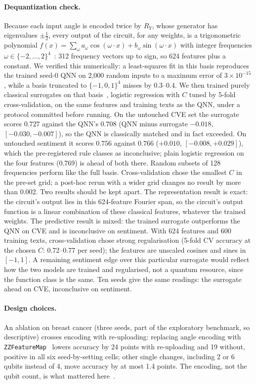 \documentclass[11pt]{article}
\begin{document}
\paragraph{Dequantization check.} Because each input angle is encoded twice by $R_Y$, whose generator has eigenvalues $\pm\tfrac12$, every output of the circuit, for any weights, is a trigonometric polynomial $f(x) = \sum_{\omega} a_\omega \cos(\omega \cdot x) + b_\omega \sin(\omega \cdot x)$ with integer frequencies $\omega \in \{-2,\dots,2\}^4$~\cite{schuld2021encoding}: 312 frequency vectors up to sign, so 624 features plus a constant. We verified this numerically: a least-squares fit in this basis reproduces the trained seed-0 QNN on 2{,}000 random inputs to a maximum error of $3 \times 10^{-15}$, while a basis truncated to $\{-1,0,1\}^4$ misses by 0.3--0.4. We then trained purely classical surrogates on that basis~\cite{landman2022rff}, logistic regression with $C$ tuned by 5-fold cross-validation, on the same features and training texts as the QNN, under a protocol committed before running. On the untouched CVE set the surrogate scores $0.727$ against the QNN's $0.708$ (QNN minus surrogate $-0.018$, $[-0.030, -0.007]$), so the QNN is classically matched and in fact exceeded. On untouched sentiment it scores $0.756$ against $0.766$ ($+0.010$, $[-0.008, +0.029]$), which the pre-registered rule classes as inconclusive; plain logistic regression on the four features (0.769) is ahead of both there. Random subsets of 128 frequencies perform like the full basis. Cross-validation chose the smallest $C$ in the pre-set grid; a post-hoc rerun with a wider grid changes no result by more than 0.002. Two results should be kept apart. The representation result is exact: the circuit's output lies in this 624-feature Fourier span, so the circuit's output function is a linear combination of these classical features, whatever the trained weights. The predictive result is mixed: the trained surrogate outperforms the QNN on CVE and is inconclusive on sentiment. With 624 features and 600 training texts, cross-validation chose strong regularisation (5-fold CV accuracy at the chosen $C$: 0.72--0.77 per seed); the features are unscaled cosines and sines in $[-1, 1]$. A remaining sentiment edge over this particular surrogate would reflect how the two models are trained and regularised, not a quantum resource, since the function class is the same. Ten seeds give the same readings: the surrogate ahead on CVE, inconclusive on sentiment.

\paragraph{Design choices.} An ablation on breast cancer (three seeds, part of the exploratory benchmark, so descriptive) crosses encoding with re-uploading: replacing angle encoding with \texttt{ZZFeatureMap}~\cite{havlicek2019supervised} lowers accuracy by 24 points with re-uploading and 19 without, positive in all six seed-by-setting cells; other single changes, including 2 or 6 qubits instead of 4, move accuracy by at most 1.4 points. The encoding, not the qubit count, is what mattered here~\cite{perezsalinas2020reuploading,schuld2021encoding}.
\end{document}
